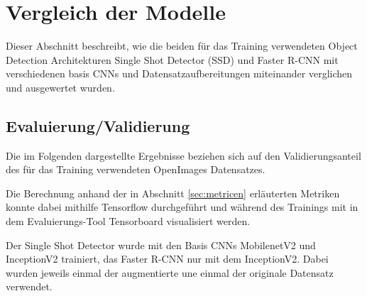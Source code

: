 \section{Vergleich der Modelle}\label{sec:model_vergleich}

Dieser Abschnitt beschreibt, wie die beiden für das Training 
verwendeten Object Detection Architekturen Single Shot Detector (SSD)
und Faster R-CNN mit verschiedenen basis
CNNs und Datensatzaufbereitungen miteinander verglichen und 
ausgewertet wurden.


\subsection{Evaluierung/Validierung}

Die im Folgenden dargestellte Ergebnisse beziehen sich auf 
den Validierungsanteil des für das Training verwendeten 
OpenImages Datensatzes.

Die Berechnung anhand der in Abschnitt \ref{sec:metricen}
 erläuterten 
Metriken konnte dabei mithilfe Tensorflow durchgeführt 
und während des Trainings mit in dem Evaluierungs-Tool 
Tensorboard visualisiert werden.

Der Single Shot Detector wurde mit den Basis CNNs MobilenetV2 und
InceptionV2 trainiert, das Faster R-CNN nur mit dem InceptionV2.
Dabei wurden jeweils einmal der augmentierte une einmal 
der originale Datensatz verwendet.


